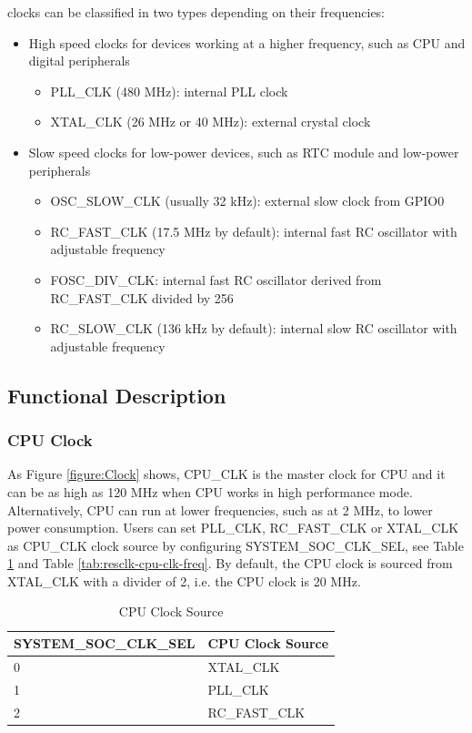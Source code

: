 \documentclass[main\_\_EN.tex]{subfiles}
\begin{document}
\chipname{} clocks can be classified in two types depending on their frequencies:
\begin{itemize}
    \item High speed clocks for devices working at a higher frequency, such as CPU and digital peripherals
    \begin{itemize}
        \item PLL\_CLK (480 MHz): internal PLL clock
        \item XTAL\_CLK (26 MHz or 40 MHz): external crystal clock
    \end{itemize}
    \item Slow speed clocks for low-power devices, such as RTC module and low-power peripherals
    \begin{itemize}
        \item OSC\_SLOW\_CLK (usually 32 kHz): external slow clock from GPIO0
	    \item RC\_FAST\_CLK (17.5 MHz by default): internal fast RC oscillator with adjustable frequency
	    \item FOSC\_DIV\_CLK: internal fast RC oscillator derived from RC\_FAST\_CLK divided by 256
	    \item RC\_SLOW\_CLK (136 kHz by default): internal slow RC oscillator with adjustable frequency
    \end{itemize}
\end{itemize}

\subsection{Functional Description}

\subsubsection{CPU Clock}

As Figure \ref{figure:Clock} shows, CPU\_CLK is the master clock for CPU and it can be as high as 120 MHz when CPU works in high performance mode. Alternatively, CPU can run at lower frequencies, such as at 2 MHz, to lower power consumption.
Users can set PLL\_CLK, RC\_FAST\_CLK or XTAL\_CLK as CPU\_CLK clock source by configuring SYSTEM\_SOC\_CLK\_SEL, see Table  \ref{tab:resclk-cpu-clk-src} and Table  \ref{tab:resclk-cpu-clk-freq}. By default, the CPU clock is sourced from XTAL\_CLK with a divider of 2, i.e. the CPU clock is 20 MHz.

\begin{longtable}[c]{|p{5cm}|p{5cm}| }
       \caption{CPU Clock Source}
		\label{tab:resclk-cpu-clk-src} \\
	    \hline
        \rowcolor{lightgray}
        \textbf{SYSTEM\_SOC\_CLK\_SEL} & \textbf{CPU Clock Source} \\
        \hline
        0 & XTAL\_CLK \\
        \hline
        1 & PLL\_CLK \\
        \hline
        2 & RC\_FAST\_CLK \\
        \hline
\end{longtable}
\end{document}
